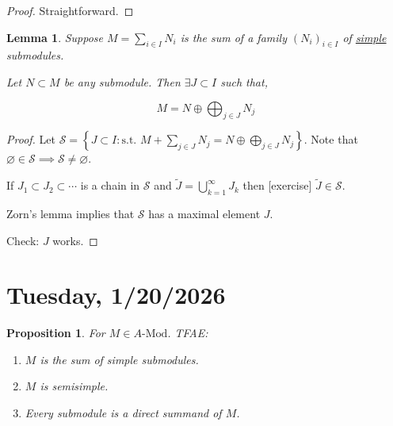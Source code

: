 \documentclass{article}
\theoremstyle{definition}
\theoremstyle{plain}
\newtheorem{proposition}[theorem]{Proposition}
\newtheorem{lemma}[theorem]{Lemma}
\theoremstyle{remark}
\begin{document}
    \begin{proof}
        Straightforward.
    \end{proof}

    \begin{lemma}
        Suppose \(M = \sum_{i\in I} N_i\) is the sum of a family \((N_i)_{i\in I}\) of \underline{simple} submodules.
        
        Let \(N \subset M\) be any submodule. Then \(\exists J \subset I\) such that,

        \[
            M = N \oplus \bigoplus_{j\in J} N_j
        \]
    \end{lemma}

    \begin{proof}
        Let \(\mathscr{S} = \left\{ J \subset I : \text{s.t. } M + \sum_{j\in J} N_j = N \oplus \bigoplus_{j\in J} N_j  \right\} \). Note that \(\varnothing \in \mathscr{S} \implies \mathscr{S} \neq \varnothing\).

        If \(J_1 \subset J_2 \subset \cdots\) is a chain in \(\mathscr{S}\) and \(\widetilde{J} = \bigcup_{k=1}^{\infty} J_k\) then [exercise] \(\widetilde{J} \in \mathscr{S}\).

        Zorn's lemma implies that \(\mathscr{S}\) has a maximal element \(J\).

        Check: \(J\) works.

    \end{proof}

    \section*{Tuesday, 1/20/2026}
    
    \begin{proposition}
        For \(M \in A \text{-Mod}\). TFAE:


        \begin{enumerate}[label=\roman*)]
            \item \(M\) is the sum of simple submodules.
            \item \(M\) is semisimple.
            \item Every submodule is a direct summand of \(M\). 
        \end{enumerate} 
    \end{proposition}
\end{document}
